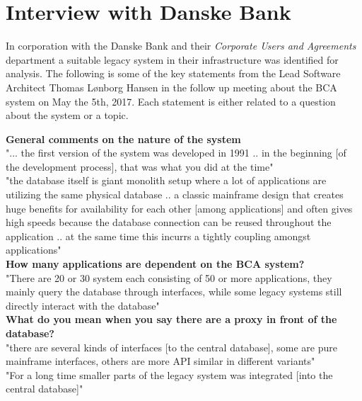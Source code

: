 \chapter{Interview with Danske Bank}
\label{app:interview}

In corporation with the Danske Bank and their \textit{Corporate Users and Agreements} department a suitable legacy system in their infrastructure was identified for analysis. The following is  some of the key statements from the Lead Software Architect Thomas Lønborg Hansen in the follow up meeting about the BCA system on May the 5th, 2017. Each statement is either related to a question about the system or a topic.

\textbf{General comments on the nature of the system}\\
"... the first version of the system was developed in 1991 .. in the beginning [of the development process], that was what you did at the time"\\

"the database itself is giant monolith setup where a lot of applications are utilizing the same physical database .. a classic mainframe design that creates huge benefits for availability for each other [among applications] and often gives high speeds because the database connection can be reused throughout the application .. at the same time this incurrs a tightly coupling amongst applications"\\

\textbf{How many applications are dependent on the BCA system?}\\
"There are 20 or 30 system each consisting of 50 or more applications, they mainly query the database through interfaces, while some legacy systems still directly interact with the database"\\

\textbf{What do you mean when you say there are a proxy in front of the database?}\\
"there are several kinds of interfaces [to the central database], some are pure mainframe interfaces, others are more API similar in different variants"\\
"For a long time smaller parts of the legacy system was integrated [into the central database]"\\

